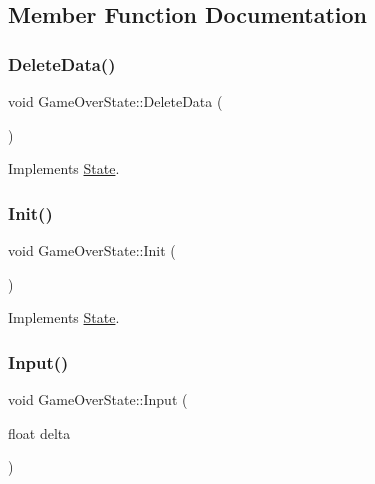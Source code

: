 \subsection{Member Function Documentation}
\mbox{\label{classGameOverState_afb6fa68ff0c5e4f83725de8059c4f7c8}} 
\subsubsection{\texorpdfstring{Delete\+Data()}{DeleteData()}}
{\footnotesize\ttfamily void Game\+Over\+State\+::\+Delete\+Data (\begin{DoxyParamCaption}{ }\end{DoxyParamCaption})\hspace{0.3cm}{\ttfamily [virtual]}}



Implements \hyperlink{classState_ade502eaa386d570e526eb356ffd73fd8}{State}.

\mbox{\label{classGameOverState_aa3d4f165ff735552f16132e929d369c2}} 
\subsubsection{\texorpdfstring{Init()}{Init()}}
{\footnotesize\ttfamily void Game\+Over\+State\+::\+Init (\begin{DoxyParamCaption}{ }\end{DoxyParamCaption})\hspace{0.3cm}{\ttfamily [virtual]}}



Implements \hyperlink{classState_a7ab4d8c6aa239a17ed579d89a209b156}{State}.

\mbox{\label{classGameOverState_adb4be2a5c6292d020999c2da9588ebfc}} 
\subsubsection{\texorpdfstring{Input()}{Input()}}
{\footnotesize\ttfamily void Game\+Over\+State\+::\+Input (\begin{DoxyParamCaption}\item[{float}]{delta }\end{DoxyParamCaption})\hspace{0.3cm}{\ttfamily [virtual]}}



